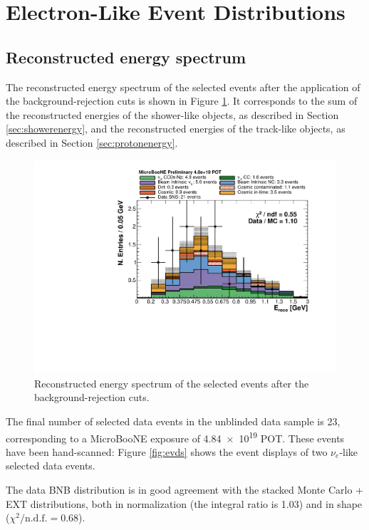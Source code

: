
\section{Electron-Like Event Distributions}
\subsection{Reconstructed energy spectrum}
The reconstructed energy spectrum of the selected events after the application of the background-rejection cuts is shown in Figure \ref{fig:spectrum_after}. It corresponds to the sum of the reconstructed energies of the shower-like objects, as described in Section \ref{sec:showerenergy}, and the reconstructed energies of the track-like objects, as described in Section \ref{sec:protonenergy}. 

\begin{figure}[htbp]
\centering
  \includegraphics[width=0.65\linewidth]{figures/h_fixed_energy_after.pdf}
    \caption{Reconstructed energy spectrum of the selected events after the background-rejection cuts.}\label{fig:spectrum_after}

\end{figure}


The final number of selected data events in the unblinded data sample is 23, corresponding to a MicroBooNE exposure of  \num{4.84e19} POT. These events have been hand-scanned: Figure \ref{fig:evds} shows the event displays of two $\nu_{e}$-like selected data events.


The data BNB distribution is in good agreement with the stacked Monte Carlo + EXT distributions, both in normalization (the integral ratio is 1.03) and in shape ($\chi^2 /\mathrm{n.d.f.} = 0.68$). 

